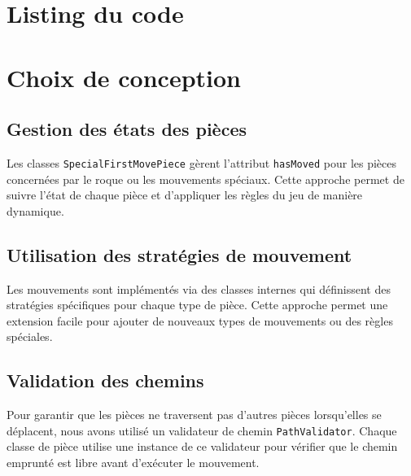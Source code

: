 \documentclass[12pt]{report}
\begin{document}
    \section*{Listing du code}
    







    \section*{Choix de conception}
    \subsection*{Gestion des états des pièces}
    Les classes \texttt{SpecialFirstMovePiece} gèrent l'attribut \texttt{hasMoved} pour les pièces concernées par le roque ou les mouvements spéciaux. Cette approche permet de suivre l'état de chaque pièce et d'appliquer les règles du jeu de manière dynamique.

    \subsection*{Utilisation des stratégies de mouvement}
    Les mouvements sont implémentés via des classes internes qui définissent des stratégies spécifiques pour chaque type de pièce. Cette approche permet une extension facile pour ajouter de nouveaux types de mouvements ou des règles spéciales.

    \subsection*{Validation des chemins}
    Pour garantir que les pièces ne traversent pas d'autres pièces lorsqu'elles se déplacent, nous avons utilisé un validateur de chemin \texttt{PathValidator}. Chaque classe de pièce utilise une instance de ce validateur pour vérifier que le chemin emprunté est libre avant d'exécuter le mouvement.
\end{document}
